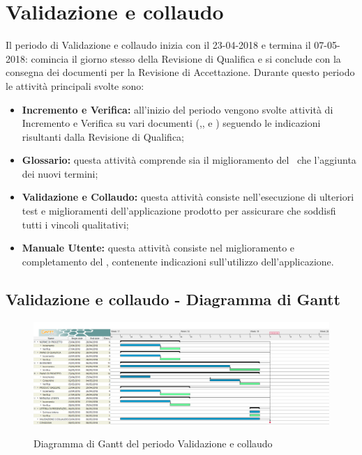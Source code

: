 \documentclass[PianoDiProgetto.tex]{subfiles}
\begin{document}
\section{Validazione e collaudo}
Il periodo di Validazione e collaudo inizia con il 23-04-2018 e termina il 07-05-2018: comincia il giorno stesso della Revisione di Qualifica e si conclude
con la consegna dei documenti per la Revisione di Accettazione. Durante questo periodo le attività principali svolte sono:
\begin{itemize}
\item \textbf{Incremento e Verifica:} all’inizio del periodo vengono svolte attività di Incremento e Verifica su vari documenti (\normediprogetto,\pianodiprogetto, \pianodiqualifica e \product) seguendo le indicazioni risultanti dalla Revisione di Qualifica;
\item \textbf{Glossario:} questa attività comprende sia il miglioramento del \glossario\ che l’aggiunta dei nuovi termini;
\item \textbf{Validazione e Collaudo:} questa attività consiste nell’esecuzione di ulteriori test e miglioramenti dell'applicazione prodotto per assicurare che soddisfi tutti i vincoli qualitativi;
\item  \textbf{Manuale Utente:} questa attività consiste nel miglioramento e completamento del \manualeutente, contenente indicazioni sull’utilizzo dell'applicazione.
\end{itemize}
\begin{landscape}
\subsection{Validazione e collaudo - Diagramma di Gantt}
\begin{figure}[ht]
	\includegraphics[width=21cm]{images/gantt/collaudo.png}
	\label{fig:foo}
	\caption{Diagramma di Gantt del periodo Validazione e collaudo}
\end{figure}
\end{landscape}	
\end{document}
